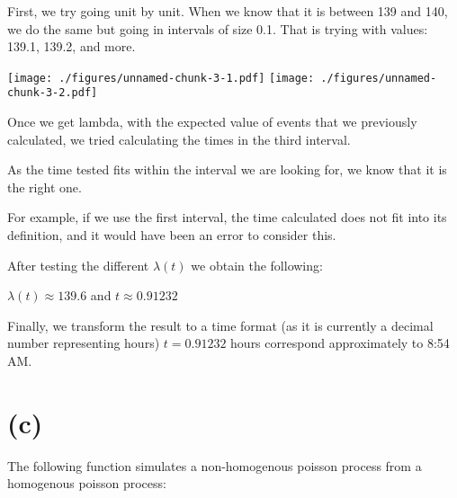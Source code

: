 \documentclass[]{article}
\begin{document}
First, we try going unit by unit. When we know that it is between 139
and 140, we do the same but going in intervals of size 0.1. That is
trying with values: 139.1, 139.2, and more.

\texttt{[image: ./figures/unnamed-chunk-3-1.pdf]}
\texttt{[image: ./figures/unnamed-chunk-3-2.pdf]}

Once we get lambda, with the expected value of events that we previously
calculated, we tried calculating the times in the third interval.

As the time tested fits within the interval we are looking for, we know
that it is the right one.

For example, if we use the first interval, the time calculated does not
fit into its definition, and it would have been an error to consider
this.

After testing the different \(\lambda (t)\) we obtain the following:

\(\lambda (t) \approx 139.6\) and \(t \approx 0.91232\)

Finally, we transform the result to a time format (as it is currently a
decimal number representing hours) \(t = 0.91232\) hours correspond
approximately to 8:54 AM.

\newpage

\hypertarget{c}{%
\section{(c)}\label{c}}

The following function simulates a non-homogenous poisson process from a
homogenous poisson process:
\end{document}
